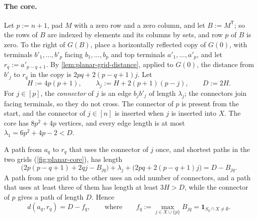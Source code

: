 \paragraph{The core.}
Let $p:=n+1$, pad $M$ with a zero row and a zero column, and let $B:=M^{\mathsf T}$; so the rows of $B$ are indexed by elements and its columns by sets, and row $p$ of $B$ is zero. To the right of $G(B)$, place a horizontally reflected copy of $G(0)$, with terminals $b'_1,\dots,b'_p$ facing $b_1,\dots,b_p$ and top terminals $a'_1,\dots,a'_p$, and let $r_q:=a'_{p-q+1}$. By \cref{lem:planar-grid-distance}, applied to $G(0)$, the distance from $b'_j$ to $r_q$ in the copy is $2pq+2(p-q+1)j$. Let
\[
 H:=4p(p+1),\qquad \lambda_j:=H+2(p+1)(p-j),\qquad D:=2H.
\]
For $j\in[p]$, the \emph{connector} of $j$ is an edge $b_jb'_j$ of length $\lambda_j$; the connectors join facing terminals, so they do not cross. The connector of $p$ is present from the start, and the connector of $j\in[n]$ is inserted when $j$ is inserted into $X$. The core has $8p^2+4p$ vertices, and every edge length is at most $\lambda_1=6p^2+4p-2<D$.

A path from $a_q$ to $r_q$ that uses the connector of $j$ once, and shortest paths in the two grids (\cref{fig:planar-core}), has length
\[
 \bigl(2p(p-q+1)+2qj-B_{jq}\bigr)+\lambda_j+\bigl(2pq+2(p-q+1)j\bigr)=D-B_{jq}.
\]
A path from one grid to the other uses an odd number of connectors, and a path that uses at least three of them has length at least $3H>D$, while the connector of $p$ gives a path of length $D$. Hence
\begin{equation}\label{eq:planar-bit-distance}
 d(a_q,r_q)=D-f_q,\qquad\text{where}\qquad f_q:=\max_{j\in X\cup\{p\}}B_{jq}=\mathbf 1_{S_q\cap X\ne\emptyset}.
\end{equation}

